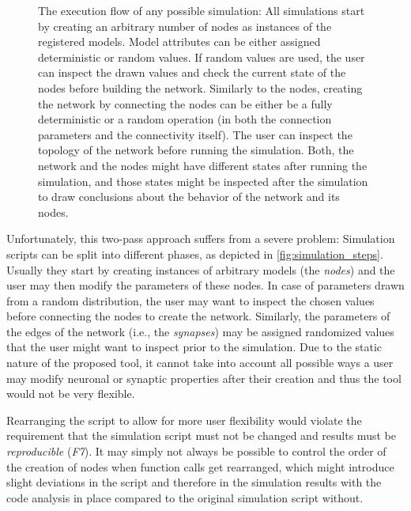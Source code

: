 \begin{figure}[ht!]
    \caption{The execution flow of any possible simulation: All simulations start by creating an arbitrary number of nodes as instances of the registered models. Model attributes can be either assigned deterministic or random values. If random values are used, the user can inspect the drawn values and check the current state of the nodes before building the network. Similarly to the nodes, creating the network by connecting the nodes can be either be a fully deterministic or a random operation (in both the connection parameters and the connectivity itself). The user can inspect the topology of the network before running the simulation. Both, the network and the nodes might have different states after running the simulation, and those states might be inspected after the simulation to draw conclusions about the behavior of the network and its nodes.}
    \label{fig:simulation_steps}
\end{figure}



Unfortunately, this two-pass approach suffers from a severe problem: Simulation scripts can be split into different phases, as depicted in \autoref{fig:simulation_steps}. Usually they start by creating instances of arbitrary models (the \emph{nodes}) and the user may then modify the parameters of these nodes. In case of parameters drawn from a random distribution, the user may want to inspect the chosen values before connecting the nodes to create the network. Similarly, the parameters of the edges of the network (i.e., the \emph{synapses}) may be assigned randomized values that the user might want to inspect prior to the simulation. Due to the static nature of the proposed tool, it cannot take into account all possible ways a user may modify neuronal or synaptic properties after their creation and thus the tool would not be very flexible.

Rearranging the script to allow for more user flexibility would violate the requirement that the simulation script must not be changed and results must be \emph{reproducible} (\emph{F7}). It may simply not always be possible to control the order of the creation of nodes when function calls get rearranged, which might introduce slight deviations in the script and therefore in the simulation results with the code analysis in place compared to the original simulation script without.

